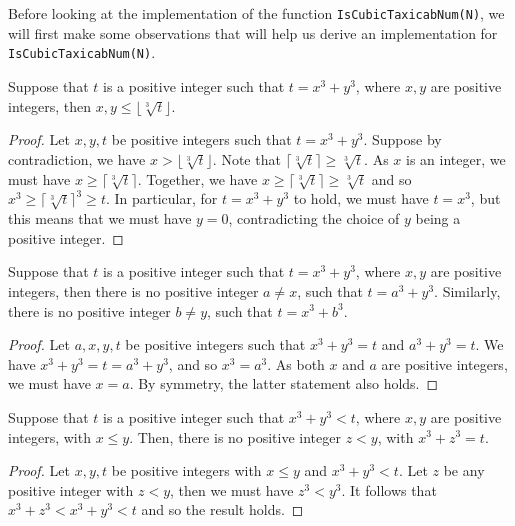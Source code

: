 Before looking at the implementation of the function \lstinline|IsCubicTaxicabNum(N)|, we will first make some observations that will help us derive an implementation for \lstinline|IsCubicTaxicabNum(N)|.

\begin{claim}
	Suppose that $t$ is a positive integer such that $t = x^3 + y^3$, where $x, y$ are positive integers, then $x, y \leq \lfloor \sqrt[3]{t} \rfloor$.
\end{claim}
\begin{proof}
	Let $x, y, t$ be positive integers such that $t = x^3 + y^3$. Suppose by contradiction, we have $x > \lfloor \sqrt[3]{t} \rfloor$. Note that $\lceil \sqrt[3]{t} \rceil \geq \sqrt[3]{t}$. As $x$ is an integer, we must have $x \geq \lceil \sqrt[3]{t} \rceil$. Together, we have $x \geq \lceil \sqrt[3]{t} \rceil \geq \sqrt[3]{t}$ and so $x^3 \geq \lceil \sqrt[3]{t} \rceil^3 \geq t$. In particular, for $t = x^3 + y^3$ to hold, we must have $t = x^3$, but this means that we must have $y = 0$, contradicting the choice of $y$ being a positive integer.
\end{proof}

\begin{observation}
	Suppose that $t$ is a positive integer such that $t = x^3 + y^3$, where $x, y$ are positive integers, then there is no positive integer $a \neq x$, such that $t = a^3 + y^3$. Similarly, there is no positive integer $b \neq y$, such that $t = x^3 + b^3$.
\end{observation}
\begin{proof}
	Let $a, x, y, t$ be positive integers such that $x^3 + y^3 = t$ and $a^3 + y^3 = t$. We have $x^3 + y^3 = t = a^3 + y^3$, and so $x^3 = a^3$. As both $x$ and $a$ are positive integers, we must have $x = a$. By symmetry, the latter statement also holds.
\end{proof}

\begin{observation}
	Suppose that $t$ is a positive integer such that $x^3 + y^3 < t$, where $x, y$ are positive integers, with $x \leq y$. Then, there is no positive integer $z < y$, with $x^3 + z^3 = t$.
\end{observation}
\begin{proof}
	Let $x, y, t$ be positive integers with $x \leq y$ and $x^3 + y^3 < t$. Let $z$ be any positive integer with $z < y$, then we must have $z^3 < y^3$. It follows that $x^3 + z^3 < x^3 + y^3 < t$ and so the result holds.
\end{proof}

